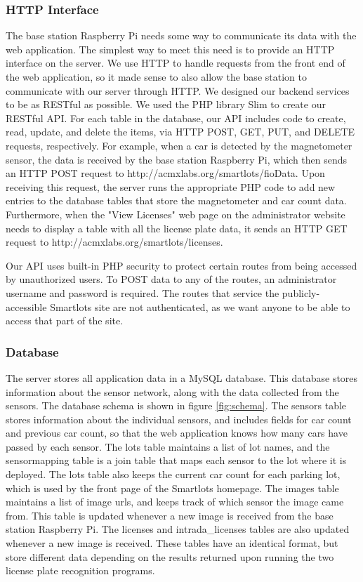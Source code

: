 \documentclass[11pt, oneside, fullpage, doublespace]{article}
\begin{document}
\subsubsection{HTTP Interface}
The base station Raspberry Pi needs some way to communicate its data with the web application. The simplest way to meet this need is to provide an HTTP interface on the server. We use HTTP to handle requests from the front end of the web application, so it made sense to also allow the base station to communicate with our server through HTTP. We designed our backend services to be as RESTful \cite{REST} as possible. We used the PHP library Slim \cite{Slim} to create our RESTful API. For each table in the database, our API includes code to create, read, update, and delete the items, via HTTP POST, GET, PUT, and DELETE requests, respectively. For example, when a car is detected by the magnetometer sensor, the data is received by the base station Raspberry Pi, which then sends an HTTP POST request to http://acmxlabs.org/smartlots/fioData. Upon receiving this request, the server runs the appropriate PHP code to add new entries to the database tables that store the magnetometer and car count data. Furthermore, when the "View Licenses" web page on the administrator website needs to display a table with all the license plate data, it sends an HTTP GET request to http://acmxlabs.org/smartlots/licenses.

Our API uses built-in PHP security to protect certain routes from being accessed by unauthorized users. To POST data to any of the routes, an administrator username and password is required. The routes that service the publicly-accessible Smartlots site are not authenticated, as we want anyone to be able to access that part of the site.

\subsubsection{Database}
The server stores all application data in a MySQL database. This database stores information about the sensor network, along with the data collected from the sensors. The database schema is shown in figure \ref{fig:schema}. The sensors table stores information about the individual sensors, and includes fields for car count and previous car count, so that the web application knows how many cars have passed by each sensor. The lots table maintains a list of lot names, and the sensormapping table is a join table that maps each sensor to the lot where it is deployed. The lots table also keeps the current car count for each parking lot, which is used by the front page of the Smartlots homepage. The images table maintains a list of image urls, and keeps track of which sensor the image came from. This table is updated whenever a new image is received from the base station Raspberry Pi. The licenses and intrada\_licenses tables are also updated whenever a new image is received. These tables have an identical format, but store different data depending on the results returned upon running the two license plate recognition programs.
\end{document}
